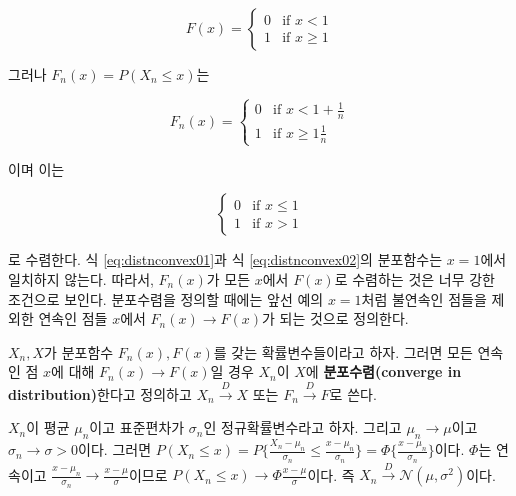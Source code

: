 \documentclass[b5paper,]{scrbook}
\theoremstyle{plain}
\theoremstyle{definition}
\numberwithin{equation}{section}
\let\BeginKnitrBlock\begin \let\EndKnitrBlock\end
\begin{document}
\begin{equation}
F(x)=
\begin{cases}
0 & \text{if } x < 1 \\
1 & \text{if } x \geq 1 
\end{cases}
\label{eq:distnconvex01}
\end{equation}

그러나 \(F_{n}(x)=P(X_{n}\leq x)\)는

\begin{equation}
F_{n}(x)=
\begin{cases}
0 & \text{if } x < 1 + \frac{1}{n} \\
1 & \text{if } x \geq 1 \frac{1}{n}
\end{cases}
\label{eq:distnconvex02}
\end{equation}

이며 이는

\begin{equation}
\begin{cases}
0 & \text{if } x \leq 1 \\
1 & \text{if } x > 1
\end{cases}
\end{equation}

로 수렴한다. 식 \eqref{eq:distnconvex01}과 식 \eqref{eq:distnconvex02}의 분포함수는 \(x=1\)에서 일치하지 않는다. 따라서, \(F_{n}(x)\)가 모든 \(x\)에서 \(F(x)\)로 수렴하는 것은 너무 강한 조건으로 보인다. 분포수렴을 정의할 때에는 앞선 예의 \(x=1\)처럼 불연속인 점들을 제외한 연속인 점들 \(x\)에서 \(F_{n}(x) \rightarrow F(x)\)가 되는 것으로 정의한다.

\BeginKnitrBlock{definition}[분포수렴]
\protect\hypertarget{def:unnamed-chunk-121}{}{\label{def:unnamed-chunk-121} {} }\(X_{n}, X\)가 분포함수 \(F_{n}(x), F(x)\)를 갖는 확률변수들이라고 하자. 그러면 모든 연속인 점 \(x\)에 대해 \(F_{n}(x)\rightarrow F(x)\)일 경우 \(X_{n}\)이 \(X\)에 \textbf{분포수렴(converge in distribution)}한다고 정의하고 \(X_{n}\stackrel{D}{\rightarrow} X\) 또는 \(F_{n}\stackrel{D}{\rightarrow} F\)로 쓴다.
\EndKnitrBlock{definition}

\BeginKnitrBlock{example}[정규분포에서 나온 확률변수들의 분포수렴]
\protect\hypertarget{exm:unnamed-chunk-122}{}{\label{exm:unnamed-chunk-122} {} }\(X_{n}\)이 평균 \(\mu_{n}\)이고 표준편차가 \(\sigma_{n}\)인 정규확률변수라고 하자. 그리고 \(\mu_{n}\rightarrow\mu\)이고 \(\sigma_{n}\rightarrow\sigma >0\)이다. 그러면 \(P(X_{n}\leq x) = P\{\frac{X_{n}-\mu_{n}}{\sigma_{n}}\leq \frac{x-\mu_{n}}{\sigma_{n}}\}=\Phi\{ \frac{x-\mu_{n}}{\sigma_{n}} \}\)이다. \(\Phi\)는 연속이고 \(\frac{x-\mu_{n}}{\sigma_{n}}\rightarrow \frac{x-\mu}{\sigma}\)이므로 \(P(X_{n}\leq x) \rightarrow \Phi\frac{x-\mu}{\sigma}\)이다. 즉 \(X_{n}\stackrel{D}{\rightarrow}\mathcal{N}(\mu,\sigma^{2})\)이다.
\EndKnitrBlock{example}
\end{document}
